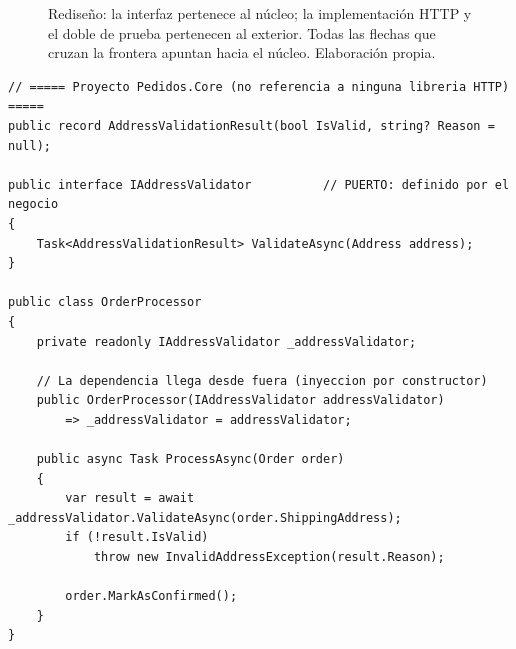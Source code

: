 \documentclass[11pt,a4paper]{article}
\begin{document}
\begin{figure}[htbp]
\centering
{}
\caption{Rediseño: la interfaz pertenece al núcleo; la implementación HTTP y el doble de prueba pertenecen al exterior. Todas las flechas que cruzan la frontera apuntan hacia el núcleo. Elaboración propia.}
\label{fig:p4}
\end{figure}

\begin{lstlisting}[caption={Núcleo de la aplicación: entidad, puerto y lógica de negocio.},label={lst:nucleo}]
// ===== Proyecto Pedidos.Core (no referencia a ninguna libreria HTTP) =====
public record AddressValidationResult(bool IsValid, string? Reason = null);

public interface IAddressValidator          // PUERTO: definido por el negocio
{
    Task<AddressValidationResult> ValidateAsync(Address address);
}

public class OrderProcessor
{
    private readonly IAddressValidator _addressValidator;

    // La dependencia llega desde fuera (inyeccion por constructor)
    public OrderProcessor(IAddressValidator addressValidator)
        => _addressValidator = addressValidator;

    public async Task ProcessAsync(Order order)
    {
        var result = await _addressValidator.ValidateAsync(order.ShippingAddress);
        if (!result.IsValid)
            throw new InvalidAddressException(result.Reason);

        order.MarkAsConfirmed();
    }
}
\end{lstlisting}
\end{document}
